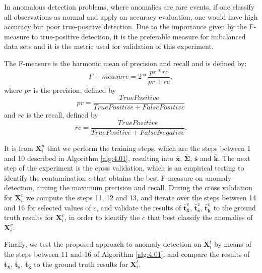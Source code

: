 In anomalous detection problems, where anomalies are rare events, if one classify all observations as normal and apply an accuracy evaluation, one would have high accuracy but poor true-positive detection. Due to the importance given by the F-measure to true-positive detection, it is the preferable measure for imbalanced data sets \cite{powers2011evaluation,moustafa2019holistic} and it is the metric used for validation of this experiment.

The F-measure is the harmonic mean of precision and recall and is defined by:
\begin{equation}\label{eq:4.15}
	F-measure = 2 * \frac{pr * rc}{pr + rc},
\end{equation}
where $pr$ is the precision, defined by 
\begin{equation}\label{eq:4.16}
	pr = \frac{True Positive}{True Positive + False Positive}
\end{equation}
and $rc$ is the recall, defined by 
\begin{equation}\label{eq:4.17}
	rc = \frac{True Positive}{True Positive + False Negative}.
\end{equation}

It is from $\boldsymbol{X}_i^n$ that we perform the training steps, which are the steps between 1 and 10 described in Algorithm \ref{alg:4.01}, resulting into $\boldsymbol{\bar{x}}$, $\boldsymbol{\bar{\Sigma}}$, $\boldsymbol{\bar{s}}$ and $\boldsymbol{\bar{k}}$. The next step of the experiment is the cross validation, which is an empirical testing to identify the contamination $c$ that obtains the best F-measure on anomaly detection, aiming the maximum precision and recall. During the cross validation for $\boldsymbol{X}_i^v$ we compute the steps 11, 12 and 13, and iterate over the steps between 14 and 16 for selected values of $c$, and validate the results of $\boldsymbol{\bar{t}}_{\bar{\boldsymbol{x}}}^v$, $\boldsymbol{\bar{t}}_{\bar{\boldsymbol{s}}}^v$, $\boldsymbol{\bar{t}}_{\bar{\boldsymbol{k}}}^v$ to the ground truth results for $\boldsymbol{X}_i^v$, in order to identify the $c$ that best classify the anomalies of $\boldsymbol{X}_i^v$. 

Finally, we test the proposed approach to anomaly detection on $\boldsymbol{X}_i^t$ by means of the steps between 11 and 16 of Algorithm \ref{alg:4.01}, and compare the results of $\boldsymbol{\bar{t}}_{\bar{\boldsymbol{x}}}$, $\boldsymbol{\bar{t}}_{\bar{\boldsymbol{s}}}$, $\boldsymbol{\bar{t}}_{\bar{\boldsymbol{k}}}$ to the ground truth results for $\boldsymbol{X}_i^t$.

